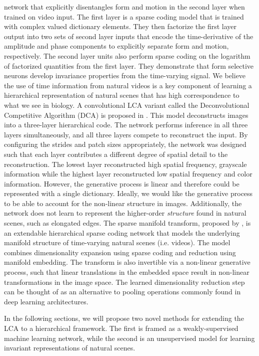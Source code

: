 network that explicitly disentangles form and motion in the second layer when trained on video input. The first layer is a sparse coding model that is trained with complex valued dictionary elements. They then factorize the first layer output into two sets of second layer inputs that encode the time-derivative of the amplitude and phase components to explicitly separate form and motion, respectively. The second layer units also perform sparse coding on the logarithm of factorized quantities from the first layer. They demonstrate that form selective neurons develop invariance properties from the time-varying signal. We believe the use of time information from natural videos is a key component of learning a hierarchical representation of natural scenes that has high correspondence to what we see in biology. A convolutional LCA variant called the Deconvolutional Competitive Algorithm (DCA) is proposed in \parencite{paiton2015deconvolutional}. This model deconstructs images into a three-layer hierarchical code. The network performs inference in all three layers simultaneously, and all three layers compete to reconstruct the input. By configuring the strides and patch sizes appropriately, the network was designed such that each layer contributes a different degree of spatial detail to the reconstruction. The lowest layer reconstructed high spatial frequency, grayscale information while the highest layer reconstructed low spatial frequency and color information. However, the generative process is linear and therefore could be represented with a single dictionary. Ideally, we would like the generative process to be able to account for the non-linear structure in images. Additionally, the network does not learn to represent the higher-order \textit{structure} found in natural scenes, such as elongated edges. The sparse manifold transform, proposed by \parencite{chen2018sparse}, is an extendable hierarchical sparse coding network that models the underlying manifold structure of time-varying natural scenes (i.e. videos). The model combines dimensionality expansion using sparse coding and reduction using manifold embedding. The transform is also invertible via a non-linear generative process, such that linear translations in the embedded space result in non-linear transformations in the image space. The learned dimensionality reduction step can be thought of as an alternative to pooling operations commonly found in deep learning architectures.

In the following sections, we will propose two novel methods for extending the LCA to a hierarchical framework. The first is framed as a weakly-supervised machine learning network, while the second is an unsupervised model for learning invariant representations of natural scenes.

